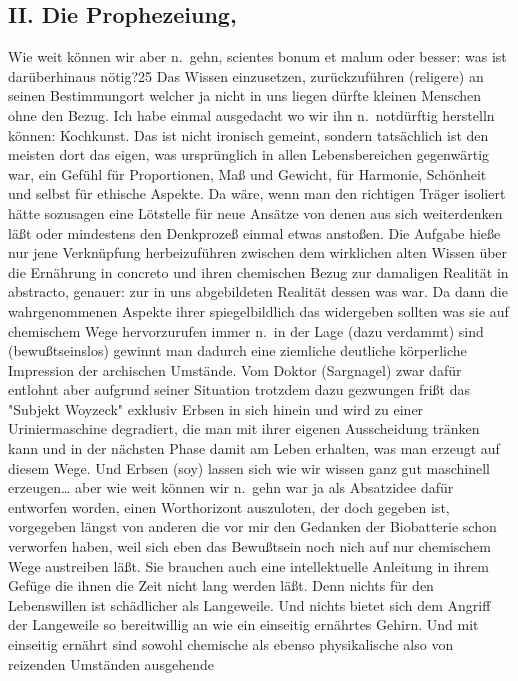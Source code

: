 \documentclass[
]{article}
\author{}
\date{\vspace{-2.5em}}
\begin{document}
\subsection{II. Die Prophezeiung,}\label{ii.-die-prophezeiung}

Wie weit können wir aber n.~gehn, scientes bonum et malum oder besser:
was ist darüberhinaus nötig?25 Das Wissen einzusetzen, zurückzuführen
(religere) an seinen Bestimmungort welcher ja nicht in uns liegen dürfte
kleinen Menschen ohne den Bezug. Ich habe einmal ausgedacht wo wir ihn
n.~notdürftig herstelln können: Kochkunst. Das ist nicht ironisch
gemeint, sondern tatsächlich ist den meisten dort das eigen, was
ursprünglich in allen Lebensbereichen gegenwärtig war, ein Gefühl für
Proportionen, Maß und Gewicht, für Harmonie, Schönheit und selbst für
ethische Aspekte. Da wäre, wenn man den richtigen Träger isoliert hätte
sozusagen eine Lötstelle für neue Ansätze von denen aus sich
weiterdenken läßt oder mindestens den Denkprozeß einmal etwas anstoßen.
Die Aufgabe hieße nur jene Verknüpfung herbeizuführen zwischen dem
wirklichen alten Wissen über die Ernährung in concreto und ihren
chemischen Bezug zur damaligen Realität in abstracto, genauer: zur in
uns abgebildeten Realität dessen was war. Da dann die wahrgenommenen
Aspekte ihrer spiegelbildlich das widergeben sollten was sie auf
chemischem Wege hervorzurufen immer n.~in der Lage (dazu verdammt) sind
(bewußtseinslos) gewinnt man dadurch eine ziemliche deutliche
körperliche Impression der archischen Umstände. Vom Doktor (Sargnagel)
zwar dafür entlohnt aber aufgrund seiner Situation trotzdem dazu
gezwungen frißt das "Subjekt Woyzeck" exklusiv Erbsen in sich hinein und
wird zu einer Uriniermaschine degradiert, die man mit ihrer eigenen
Ausscheidung tränken kann und in der nächsten Phase damit am Leben
erhalten, was man erzeugt auf diesem Wege. Und Erbsen (soy) lassen sich
wie wir wissen ganz gut maschinell erzeugen\ldots{} aber wie weit können
wir n.~gehn war ja als Absatzidee dafür entworfen worden, einen
Worthorizont auszuloten, der doch gegeben ist, vorgegeben längst von
anderen die vor mir den Gedanken der Biobatterie schon verworfen haben,
weil sich eben das Bewußtsein noch nich auf nur chemischem Wege
austreiben läßt. Sie brauchen auch eine intellektuelle Anleitung in
ihrem Gefüge die ihnen die Zeit nicht lang werden läßt. Denn nichts für
den Lebenswillen ist schädlicher als Langeweile. Und nichts bietet sich
dem Angriff der Langeweile so bereitwillig an wie ein einseitig
ernährtes Gehirn. Und mit einseitig ernährt sind sowohl chemische als
ebenso physikalische also von reizenden Umständen ausgehende
\end{document}
